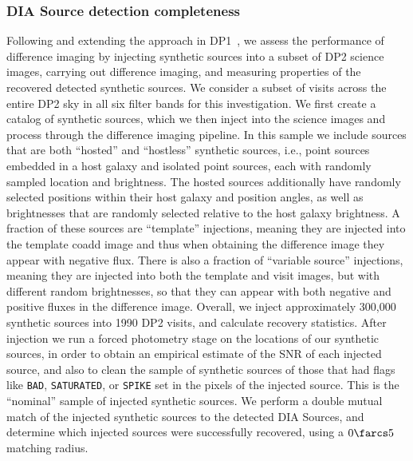 \subsubsection{DIA Source detection completeness}
Following and extending the approach in DP1~\citep[][]{rtn-095}, we assess the performance of difference imaging by injecting synthetic sources into a subset of DP2 science images, carrying out difference imaging, and measuring properties of the recovered detected synthetic sources.
We consider a subset of visits across the entire \gls{DP2} sky in all six filter bands for this investigation.
We first create a catalog of synthetic sources, which we then inject into the science images and process through the difference imaging \gls{pipeline}.
%
In this sample we include sources that are both ``hosted'' and ``hostless'' synthetic sources, i.e., point sources embedded in a host galaxy and isolated point sources, each with randomly sampled location and brightness.
%
The hosted sources additionally have randomly selected positions within their host galaxy and position angles, as well as brightnesses that are randomly selected relative to the host galaxy brightness.
%
A fraction of these sources are ``template'' injections, meaning they are injected into the template coadd image and thus when obtaining the difference image they appear with negative \gls{flux}.
%
There is also a fraction of ``variable source'' injections, meaning they are injected into both the template and visit images, but with different random brightnesses, so that they can appear with both negative and positive fluxes in the difference image.
%
Overall, we inject approximately 300,000 synthetic sources into 1990 \gls{DP2} visits, and calculate recovery statistics.
%
After injection we run a \gls{forced photometry} stage on the locations of our synthetic sources, in order to obtain an empirical estimate of the \gls{SNR} of each injected source, and also to clean the sample of synthetic sources of those that had flags like \texttt{BAD}, \texttt{SATURATED}, or \texttt{SPIKE} set in the pixels of the injected source.
This is the ``nominal'' sample of injected synthetic sources.
%
We perform a double mutual match of the injected synthetic sources to the detected \gls{DIA} Sources, and determine which injected sources were successfully recovered, using a $0\farcs5$ matching radius.

